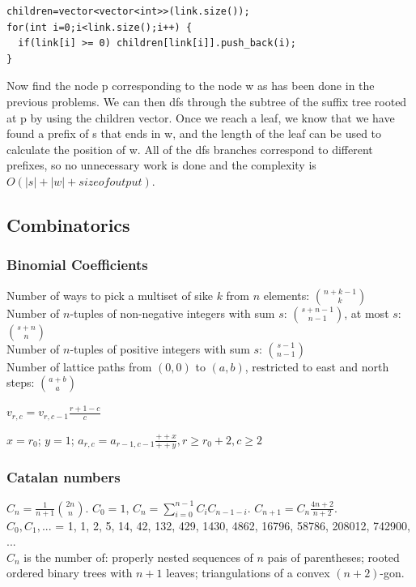 \documentclass[a4paper,13pt]{article}
\begin{document}
\begin{verbatim}
children=vector<vector<int>>(link.size());
for(int i=0;i<link.size();i++) {
  if(link[i] >= 0) children[link[i]].push_back(i);
}
\end{verbatim}

Now find the node p corresponding to the node w as has been done in the previous problems. We can then dfs through the subtree of the suffix tree rooted at p by using the children vector. Once we reach a leaf, we know that we have found a prefix of s that ends in w, and the length of the leaf can be used to calculate the position of w. All of the dfs branches correspond to different prefixes, so no unnecessary work is done and the complexity is $O(|s| + |w| + size of output)$.

\subsection{Combinatorics}
\subsubsection{Binomial Coefficients}

Number of ways to pick a multiset of sike $k$ from $n$ elements: $\binom{n+k-1}{k}$\\
Number of $n$-tuples of non-negative integers with sum $s$: $\binom{s+n-1}{n-1}$, at most $s$: $\binom{s+n}{n}$\\
Number of $n$-tuples of positive integers with sum $s$: $\binom{s-1}{n-1}$\\
Number of lattice paths from $(0,0)$ to $(a,b)$, restricted to east and north steps: $\binom{a+b}{a}$

$v_{r,c} = v_{r,c-1} \frac{r+1-c}{c}$

$x = r_0$; $y = 1$; $a_{r,c} = a_{r-1,c-1}  \frac{++x}{++y}, r \geq r_0+2, c \geq 2$

\subsubsection{Catalan numbers}
$C_{n} = \frac{1}{n+1}\binom{2n}{n}$. $C_0 = 1$,  $C_{n} = \sum_{i=0}^{n-1}C_iC_{n-1-i}$. $C_{n+1} = C_{n}\frac{4n+2}{n+2}$.\\
$C_0,C_1,... $ = 1, 1, 2, 5, 14, 42, 132, 429, 1430, 4862, 16796, 58786, 208012, 742900, ...\\
$C_{n}$ is the number of: properly nested sequences of $n$ pais of parentheses; rooted ordered binary trees with $n+1$ leaves; triangulations of a convex $(n+2)$-gon.
\end{document}
